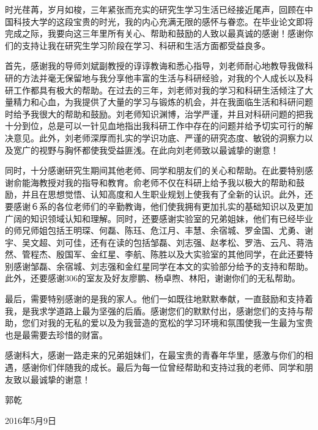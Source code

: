 \begin{acknowledgements}
\par 时光荏苒，岁月如梭，三年紧张而充实的研究生学习生活已经接近尾声，回顾在中国科技大学的这段宝贵的时光，我的内心充满无限的感怀与眷恋。在毕业论文即将完成之际，我要向这三年里所有关心、帮助和鼓励的人致以最真诚的感谢！感谢你们的支持让我在研究生学习阶段在学习、科研和生活方面都受益良多。
\par 首先，感谢我的导师刘斌副教授的谆谆教诲和悉心指导，刘老师耐心地教导我做科研的方法并毫无保留地与我分享他丰富的生活与科研经验，对我的个人成长以及科研工作都具有极大的帮助。在过去的三年，刘老师对我的学习和科研生活倾注了大量精力和心血，为我提供了大量的学习与锻炼的机会，并在我面临生活和科研问题时给予我很大的帮助和鼓励。刘老师知识渊博，治学严谨，并且对科研问题的把我十分到位，总是可以一针见血地指出我科研工作中存在的问题并给予切实可行的解决意见。此外，刘老师深厚而扎实的学识功底、严谨的研究态度、敏锐的洞察力以及宽广的视野与胸怀都使我受益匪浅。在此向刘老师致以最诚挚的谢意！
\par 同时，十分感谢研究生期间其他老师、同学和朋友们的关心和帮助。在此要特别感谢俞能海教授对我的指导和教育。俞老师不仅在科研上给予我以极大的帮助和鼓励，并且在思想觉悟、认知高度和人生职业规划上使我有了全新的认识。此外，还要感谢６系的各位老师们的辛勤教诲，他们使我拥有更加扎实的基础知识以及更加广阔的知识领域认知和理解。同时，还要感谢实验室的兄弟姐妹，他们有已经毕业的师兄师姐包括王明琛、何磊、陈珏、危江月、丰慧、余宿城、罗金国、尤勇、谢宇、吴文超、刘可佳，还有在读的包括邹磊、刘志强、赵孝松、罗浩、云凡、蒋浩然、管程杰、殷国军、金红星、李航、陈胜以及大实验室的其他同学，在此还要特别感谢邹磊、余宿城、刘志强和金红星同学在本文的实验部分给予的支持和帮助。此外，还要感谢306的室友及好友廖鹏、杨卓煦、林阳，谢谢你们的无私帮助。
\par 最后，需要特别感谢的是我的家人。他们一如既往地默默奉献，一直鼓励和支持着我，是我求学道路上最为坚强的后盾。感谢您们的默默付出，感谢您们的支持与帮助，您们对我的无私的爱以及为我营造的宽松的学习环境和氛围使我一生最为宝贵也是最需要去珍惜的财富。
\par 感谢科大，感谢一路走来的兄弟姐妹们，在最宝贵的青春年华里，感激与你们的相遇，感谢你们伴随我的成长。最后为每一位曾经帮助和支持过我的老师、同学和朋友致以最诚挚的谢意！
\begin{flushright}
\par 郭乾   \qquad
\par 2016年5月9日
\end{flushright}
\end{acknowledgements}
